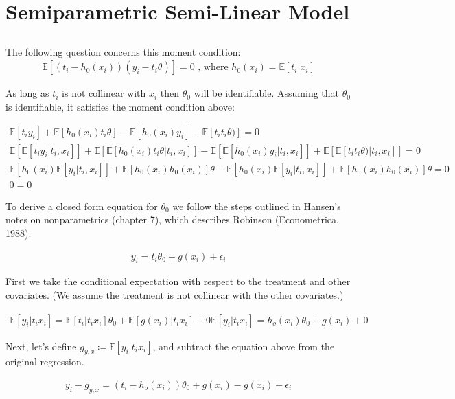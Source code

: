 \documentclass[12pt]{article}
\newcommand{\E}{\mathbb{E}}
\begin{document}
\newpage
\section{Semiparametric Semi-Linear Model}
\subsection{}

The following question concerns this moment condition:
\begin{gather*}
\E[(t_i - h_0(x_i))(y_i - t_i\theta)] = 0 \text{  , where }  h_0(x_i) = \E[t_i | x_i]
\end{gather*}

As long as $t_i$ is not collinear with $x_i$ then $\theta_0$ will be identifiable. Assuming that $\theta_0$ is identifiable, it satisfies the moment condition above:

\begin{gather*}
\E[t_i y_i] + \E[h_0(x_i)t_i\theta] - \E[h_0(x_i)y_i] - \E[t_i t_i\theta)] = 0 \\
\E[\E[t_i y_i |t_i, x_i]] + \E[\E[h_0(x_i)t_i\theta|t_i, x_i]]  - \E[\E[h_0(x_i)y_i |t_i, x_i]]  + \E[\E[t_it_i\theta) |t_i, x_i]]  = 0 \\
\E[h_0(x_i) \E[y_i |t_i, x_i]] + \E[h_0(x_i)h_0(x_i)]\theta  - \E[h_0(x_i) \E[y_i |t_i, x_i]]  + \E[h_0(x_i)h_0(x_i)]\theta   = 0 \\
0=0
\end{gather*}

To derive a closed form equation for $\theta_0$ we follow the steps outlined in Hansen's notes on nonparametrics (chapter 7), which describes Robinson (Econometrica, 1988).

\begin{gather*}
y_i = t_i\theta_0 + g(x_i) + \epsilon_i
\end{gather*}

First we take the conditional expectation with respect to the treatment and other covariates. (We assume the treatment is not collinear with the other covariates.)

\begin{gather*}
\E[y_i|t_i x_i] = \E[t_i|t_i x_i]\theta_0 + \E[g(x_i)|t_i x_i]  + 0
\E[y_i|t_i x_i] = h_o(x_i)\theta_0 + g(x_i) + 0
\end{gather*}

Next, let's define $ g_{y,x}  \coloneqq \E[y_i|t_i x_i]$, and subtract the equation above from the original regression.


\begin{gather*}
y_i - g_{y,x} = (t_i -  h_o(x_i))\theta_0 + g(x_i) - g(x_i) + \epsilon_i
\end{gather*}
\end{document}
